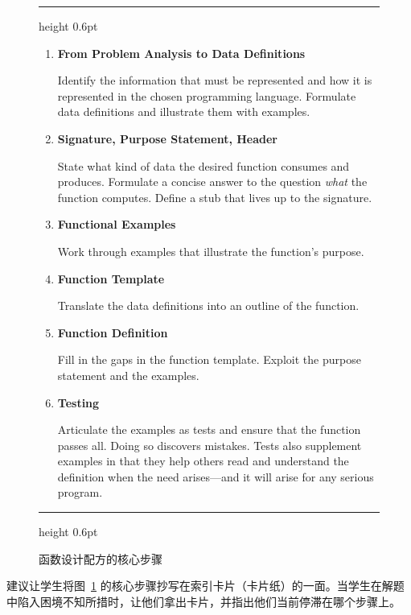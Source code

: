 \begin{figure}[htbp]
  \centering
  \begin{minipage}{\linewidth}
    \hrule height 0.6pt
    \vspace{4pt}
    \footnotesize
    \begin{enumerate}[leftmargin=1.4em, itemsep=2.5pt, parsep=0pt, topsep=1pt]
      \item \textbf{From Problem Analysis to Data Definitions}\par
      Identify the information that must be represented and how it is represented in the chosen programming language. Formulate data definitions and illustrate them with examples.
      \item \textbf{Signature, Purpose Statement, Header}\par
      State what kind of data the desired function consumes and produces. Formulate a concise answer to the question \textit{what} the function computes. Define a stub that lives up to the signature.
      \item \textbf{Functional Examples}\par
      Work through examples that illustrate the function's purpose.
      \item \textbf{Function Template}\par
      Translate the data definitions into an outline of the function.
      \item \textbf{Function Definition}\par
      Fill in the gaps in the function template. Exploit the purpose statement and the examples.
      \item \textbf{Testing}\par
      Articulate the examples as tests and ensure that the function passes all. Doing so discovers mistakes. Tests also supplement examples in that they help others read and understand the definition when the need arises---and it will arise for any serious program.
    \end{enumerate}
    \vspace{4pt}
    \hrule height 0.6pt
  \end{minipage}
  \caption{函数设计配方的核心步骤}
  \label{fig:design_recipe_steps}
\end{figure}

\begin{notebox}[教师建议]
建议让学生将图~\ref{fig:design_recipe_steps} 的核心步骤抄写在索引卡片（卡片纸）的一面。当学生在解题中陷入困境不知所措时，让他们拿出卡片，并指出他们当前停滞在哪个步骤上。
\end{notebox}

